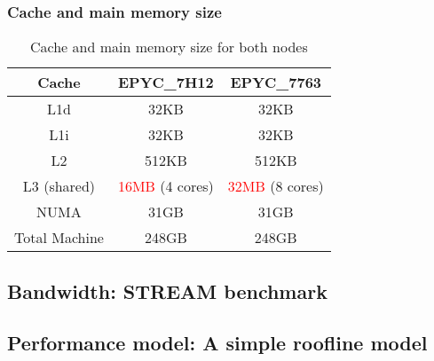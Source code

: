\documentclass[unicode,11pt,a4paper,oneside,numbers=endperiod,openany]{scrartcl}
\begin{document}
\subsubsection{Cache and main memory size}


\begin{table}[h]
    \centering
    \begin{tabular}{|c|c|c|}
        \hline

        \textbf{Cache} & \textbf{EPYC\_7H12}             & \textbf{EPYC\_7763}             \\
        \hline
        L1d            & 32KB                            & 32KB                            \\
        \hline
        L1i            & 32KB                            & 32KB                            \\
        \hline
        L2             & 512KB                           & 512KB                           \\
        \hline
        L3 (shared)    & \textcolor{red}{16MB} (4 cores) & \textcolor{red}{32MB} (8 cores) \\
        \hline
        NUMA           & 31GB                            & 31GB                            \\
        \hline
        Total Machine  & 248GB                           & 248GB                           \\
        \hline
    \end{tabular}
    \caption{Cache and main memory size for both nodes}
    \label{tab:cache_main_memory}
\end{table}


\subsection{Bandwidth: STREAM benchmark}

\subsection{Performance model: A simple roofline model}
\end{document}
